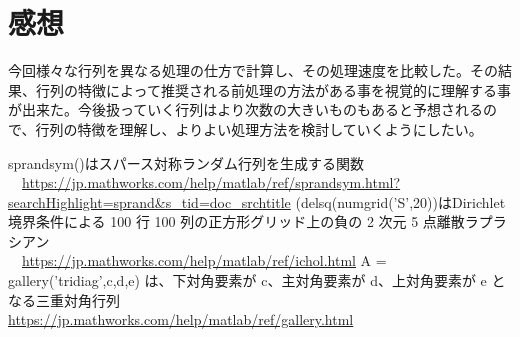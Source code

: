 ﻿\documentclass[12pt, a4paper]{jsarticle}
\begin{document}
\section{感想}
今回様々な行列を異なる処理の仕方で計算し、その処理速度を比較した。その結果、行列の特徴によって推奨される前処理の方法がある事を視覚的に理解する事が出来た。今後扱っていく行列はより次数の大きいものもあると予想されるので、行列の特徴を理解し、よりよい処理方法を検討していくようにしたい。

\begin{thebibliography}{99}
  sprandsym()はスパース対称ランダム行列を生成する関数\\　\url{https://jp.mathworks.com/help/matlab/ref/sprandsym.html?searchHighlight=sprand&s_tid=doc_srchtitle}
 (delsq(numgrid('S',20))はDirichlet 境界条件による 100 行 100 列の正方形グリッド上の負の 2 次元 5 点離散ラプラシアン\\　\url{https://jp.mathworks.com/help/matlab/ref/ichol.html}
 A = gallery('tridiag',c,d,e) は、下対角要素が c、主対角要素が d、上対角要素が e となる三重対角行列\\ \url{https://jp.mathworks.com/help/matlab/ref/gallery.html}
\end{thebibliography}
\end{document}
